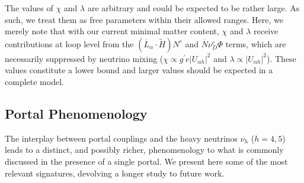 The values of $\chi$ and $\lambda$ are arbitrary and could be expected to be rather large. As such, we treat them as free parameters within their allowed ranges. Here, we merely note that with our current minimal matter content, $\chi$ and $\lambda$ receive contributions at loop level from the $(\overline{L}_\alpha \cdot \widetilde{H})N^c$ and $\overline{N} \nu_D^c \Phi$ terms, which are necessarily suppressed by neutrino mixing ($\chi \propto g^\prime e |U_{\alpha h}|^2$ and $\lambda \propto |U_{\alpha h}|^2$). These values constitute a lower bound and larger values should be expected in a complete model.


\subsection{Portal Phenomenology} \label{sec:portal_pheno}

The interplay between portal couplings and the heavy neutrinos $\nu_h$ ($h=4,5$) leads to a distinct, and possibly richer, phenomenology to what is commonly discussed in the presence of a single portal. We present here some of the most relevant signatures, devolving a longer study to future work.


